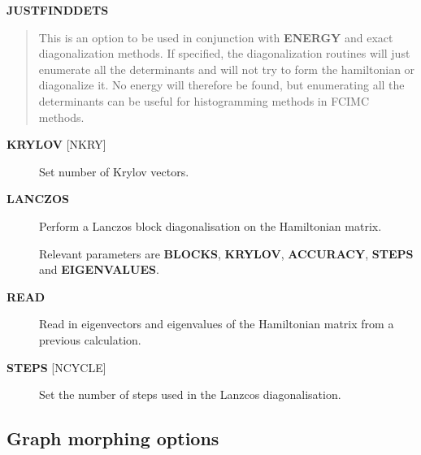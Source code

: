 \documentclass[openany,a4paper,10pt,english]{manual}
\begin{document}
\textbf{JUSTFINDDETS}
\begin{quote}

This is an option to be used in conjunction with \textbf{ENERGY} and exact diagonalization methods.
If specified, the diagonalization routines will just enumerate all the determinants and will
not try to form the hamiltonian or diagonalize it. No energy will therefore be found, but
enumerating all the determinants can be useful for histogramming methods in FCIMC methods.
\end{quote}
\begin{description}
\item[\textbf{KRYLOV} {[}NKRY{]}] \leavevmode
Set number of Krylov vectors.

\item[\textbf{LANCZOS}] \leavevmode
Perform a Lanczos block diagonalisation on the Hamiltonian matrix.

Relevant parameters are \textbf{BLOCKS}, \textbf{KRYLOV}, \textbf{ACCURACY},
\textbf{STEPS} and \textbf{EIGENVALUES}.

\item[\textbf{READ}] \leavevmode
Read in eigenvectors and eigenvalues of the Hamiltonian matrix from a previous calculation.

\item[\textbf{STEPS} {[}NCYCLE{]}] \leavevmode
Set the number of steps used in the Lanzcos diagonalisation.

\end{description}


\subsection{Graph morphing options}
\end{document}
